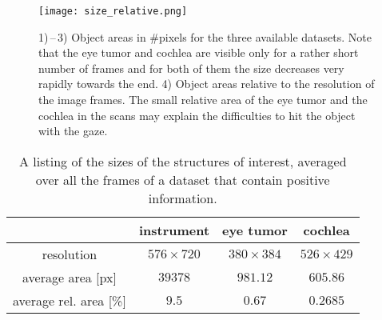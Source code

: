 \begin{figure}[ht]
	\centering
	  \texttt{[image: size\_relative.png]}
	\caption{1)\,--\,3) Object areas in \#pixels for the three available datasets. Note that the eye tumor and cochlea are visible only for a rather short number of frames and for both of them the size decreases very rapidly towards the end. 4) Object areas relative to the resolution of the image frames. The small relative area of the eye tumor and the cochlea in the scans may explain the difficulties to hit the object with the gaze.}
	\label{fig:relativeobjectsize}
\end{figure}

\begin{table}[ht]
	\centering
	  \caption{A listing of the sizes of the structures of interest, averaged over all the frames of a dataset that contain positive information.}
	  \label{tab:avgobjectsize}
	\begin{tabular}{ | c  c  c  c | }
	\hline
				& instrument 	& eye tumor & cochlea \\ \hline
	  resolution  		& $576 \times 720$ & $380 \times 384$ & $526 \times 429$ \\ 
	  average area [px]	& $39378$ 	& $981.12$ 	 & $605.86$ \\
	  average rel. area [\%]& $9.5$ 		& $0.67$ 		 & $0.2685$ \\ \hline
	\end{tabular}
\end{table}

